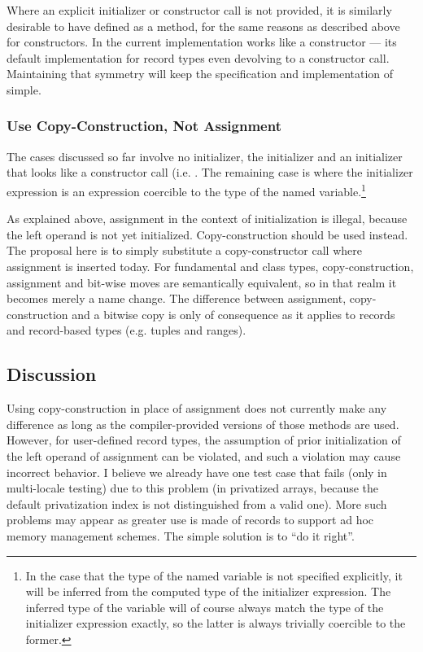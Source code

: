 Where an explicit initializer or constructor call is not provided, it is similarly desirable to have
 defined as a method, for the same reasons as described above for
constructors.  In the current implementation  works like a constructor
--- its default implementation for record types even devolving to a constructor call.
Maintaining that symmetry will keep the specification and implementation of
 simple.

\subsubsection{Use Copy-Construction, Not Assignment}

The cases discussed so far involve no initializer, the  initializer and an
initializer that looks like a constructor call (i.e. .  The remaining
case is where the initializer expression is an expression coercible to the type of the
named variable.\footnote{In the case that the type of the named variable is not specified
  explicitly, it will be inferred from the computed type of the initializer expression.
  The inferred type of the variable will of course always match the type of the
  initializer expression exactly, so the latter is always trivially coercible to the
  former.}

As explained above, assignment in the context of initialization is illegal, because the
left operand is not yet initialized.  Copy-construction should be used instead.  The
proposal here is to simply substitute a copy-constructor call where assignment is inserted
today.  For fundamental and class types, copy-construction, assignment and bit-wise moves are
semantically equivalent, so in that realm it becomes merely a name change.  The difference
between assignment, copy-construction and a bitwise copy is only of consequence as it
applies to records and record-based types (e.g. tuples and ranges).

\subsection{Discussion}

Using copy-construction in place of assignment does not currently make any difference as
long as the compiler-provided versions of those methods are used.  However, for
user-defined record types, the assumption of prior initialization of the left operand of
assignment can be violated, and such a violation may cause incorrect behavior.  I believe
we already have one test case that fails (only in multi-locale testing) due to this
problem (in privatized arrays, because the default privatization index is not distinguished
from a valid one).  More such problems may appear as greater use is made of records to
support ad hoc memory management schemes.  The simple solution is to ``do it
right''.

